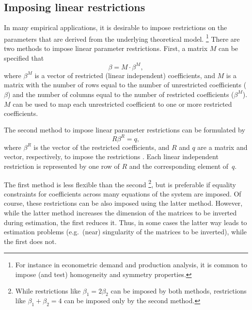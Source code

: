 \subsection{Imposing linear restrictions}\label{sec:Restrictions}

In many empirical applications,
it is desirable to impose restrictions on the parameters
that are derived from the underlying theoretical model.%
\footnote{%
For instance in econometric demand and production analysis,
it is common to impose (and test) homogeneity and symmetry properties.
}
There are two methods to impose linear parameter restrictions.
First, a matrix $M$ can be specified that
\begin{equation}
   \beta = M \cdot \beta^M \label{eq:T-restr} ,
\end{equation}
where $\beta^M$ is a vector of restricted (linear independent) coefficients,
and $M$ is a matrix with the number of rows equal to the number of
unrestricted coefficients ($\beta$) and
the number of columns equal to the number of restricted coefficients
($\beta^M$).
$M$ can be used to map each unrestricted coefficient to one or more
restricted coefficients.

The second method to impose linear parameter restrictions
can be formulated by
\begin{equation}
   R \beta^R = q ,
   \label{eq:restr-R}
\end{equation}
where $\beta^R$ is the vector of the restricted coefficients,
and $R$ and $q$ are a matrix and vector, respectively,
to impose the restrictions \citep[see][p.\ 100]{greene03}.
Each linear independent restriction is represented by one row of $R$
and the corresponding element of~$q$.

The first method is less flexible than the second%
\footnote{
While restrictions like $\beta_1 = 2 \beta_2$ can be imposed by
both methods,
restrictions like $\beta_1 + \beta_2 = 4$ can be imposed only
by the second method.
}, 
but is preferable if equality constraints for coefficients
across many equations of the system are imposed. 
Of course, these restrictions can be also imposed using
the latter method.
However, while the latter method increases the dimension of the 
matrices to be inverted during estimation, the first reduces it. 
Thus, in some cases the latter way leads to estimation problems
(e.g.\ (near) singularity of the matrices to be inverted),
while the first does not.

